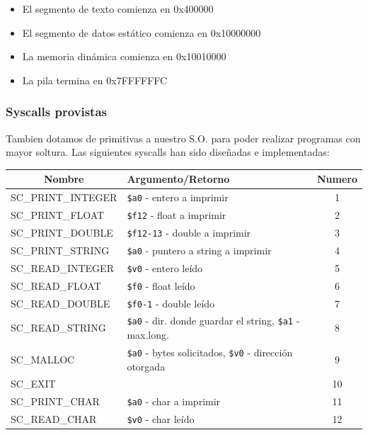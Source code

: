 \documentclass[12pt]{article}
\begin{document}
\begin{itemize}
\item El segmento de texto comienza en 0x400000
\item El segmento de datos estático comienza en 0x10000000
\item La memoria dinámica comienza en 0x10010000
\item La pila termina en 0x7FFFFFFC
\end{itemize}
\subsubsection{Syscalls provistas}
Tambien dotamos de primitivas a nuestro S.O. para poder realizar programas con mayor soltura.
Las siguientes syscalls han sido diseñadas e implementadas:
\begin{table}[H]
\centering
\begin{tabular}{@{}llc@{}}
\toprule
\multicolumn{1}{c}{Nombre} & Argumento/Retorno & Numero \\ \midrule
SC\_PRINT\_INTEGER & \texttt{\$a0} - entero a imprimir                    & 1      \\
SC\_PRINT\_FLOAT    & \texttt{\$f12} - float a imprimir                   & 2      \\
SC\_PRINT\_DOUBLE   & \texttt{\$f12-13} - double a imprimir                    & 3      \\
SC\_PRINT\_STRING   & \texttt{\$a0} - puntero a string a imprimir                   & 4      \\
SC\_READ\_INTEGER   & \texttt{\$v0} - entero leído                  & 5      \\
SC\_READ\_FLOAT     & \texttt{\$f0} - float leído                  & 6      \\
SC\_READ\_DOUBLE    & \texttt{\$f0-1} - double leído                   & 7      \\
SC\_READ\_STRING    & \texttt{\$a0} - dir. donde guardar el string, \texttt{\$a1} - max.long.                  & 8      \\
SC\_MALLOC          & \texttt{\$a0} - bytes solicitados, \texttt{\$v0} - dirección otorgada            & 9      \\
SC\_EXIT            &           & 10      \\
SC\_PRINT\_CHAR     & \texttt{\$a0} - char a imprimir                 & 11      \\
SC\_READ\_CHAR      & \texttt{\$v0} - char leído                & 12      \\
\end{tabular}%
\end{table}
\end{document}
